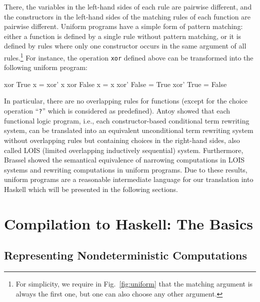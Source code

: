 \documentclass{llncs}
\newcommand{\code}[1]{\mbox{\small\texttt{#1}}}
\newcommand{\ccode}[1]{``\code{#1}''}
\begin{document}
There, the variables in the left-hand sides of each rule are pairwise
different, and
the constructors in the left-hand sides of the matching rules of each function
are pairwise different.
Uniform programs have a simple form of pattern matching:
either a function is defined by a single rule without pattern matching,
or it is defined by rules where only one constructor occurs in the same argument
of all rules.\footnote{For simplicity, we require in
Fig.~\ref{fig:uniform} that the matching argument is always the
first one, but one can also choose any other argument.}
For instance, the operation \code{xor} defined above can be transformed
into the following uniform program:
%
\begin{curry}
  xor True   x = xor' x
  xor False  x = x
  xor' False = True
  xor' True  = False
\end{curry}
%
In particular, there are no overlapping rules for functions
(except for the choice operation \ccode{?} which is considered as predefined).
Antoy \cite{Antoy01PPDP} showed that each functional logic program,
i.e., each constructor-based conditional term rewriting system,
can be translated into an equivalent unconditional term rewriting system
without overlapping rules but containing choices in the right-hand sides,
also called LOIS (limited overlapping inductively sequential) system.
Furthermore, Brassel \cite{Brassel11Thesis} showed the semantical
equivalence of narrowing computations in LOIS systems
and rewriting computations in uniform programs.
Due to these results, uniform programs are a reasonable intermediate
language for our translation into Haskell which will be presented
in the following sections.


\section{Compilation to Haskell: The Basics}
\label{sec:Compilation}

\subsection{Representing Nondeterministic Computations}
\end{document}

